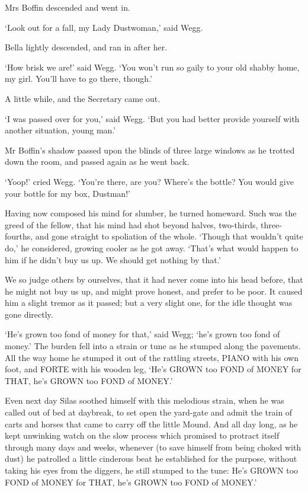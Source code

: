 Mrs Boffin descended and went in.

‘Look out for a fall, my Lady Dustwoman,’ said Wegg.

Bella lightly descended, and ran in after her.

‘How brisk we are!’ said Wegg. ‘You won’t run so gaily to your old
shabby home, my girl. You’ll have to go there, though.’

A little while, and the Secretary came out.

‘I was passed over for you,’ said Wegg. ‘But you had better provide
yourself with another situation, young man.’

Mr Boffin’s shadow passed upon the blinds of three large windows as he
trotted down the room, and passed again as he went back.

‘Yoop!’ cried Wegg. ‘You’re there, are you? Where’s the bottle? You
would give your bottle for my box, Dustman!’

Having now composed his mind for slumber, he turned homeward. Such
was the greed of the fellow, that his mind had shot beyond halves,
two-thirds, three-fourths, and gone straight to spoliation of the whole.
‘Though that wouldn’t quite do,’ he considered, growing cooler as he got
away. ‘That’s what would happen to him if he didn’t buy us up. We should
get nothing by that.’

We so judge others by ourselves, that it had never come into his head
before, that he might not buy us up, and might prove honest, and prefer
to be poor. It caused him a slight tremor as it passed; but a very
slight one, for the idle thought was gone directly.

‘He’s grown too fond of money for that,’ said Wegg; ‘he’s grown too fond
of money.’ The burden fell into a strain or tune as he stumped along the
pavements. All the way home he stumped it out of the rattling streets,
PIANO with his own foot, and FORTE with his wooden leg, ‘He’s GROWN too
FOND of MONEY for THAT, he’s GROWN too FOND of MONEY.’

Even next day Silas soothed himself with this melodious strain, when he
was called out of bed at daybreak, to set open the yard-gate and admit
the train of carts and horses that came to carry off the little Mound.
And all day long, as he kept unwinking watch on the slow process which
promised to protract itself through many days and weeks, whenever
(to save himself from being choked with dust) he patrolled a little
cinderous beat he established for the purpose, without taking his eyes
from the diggers, he still stumped to the tune: He’s GROWN too FOND of
MONEY for THAT, he’s GROWN too FOND of MONEY.’



